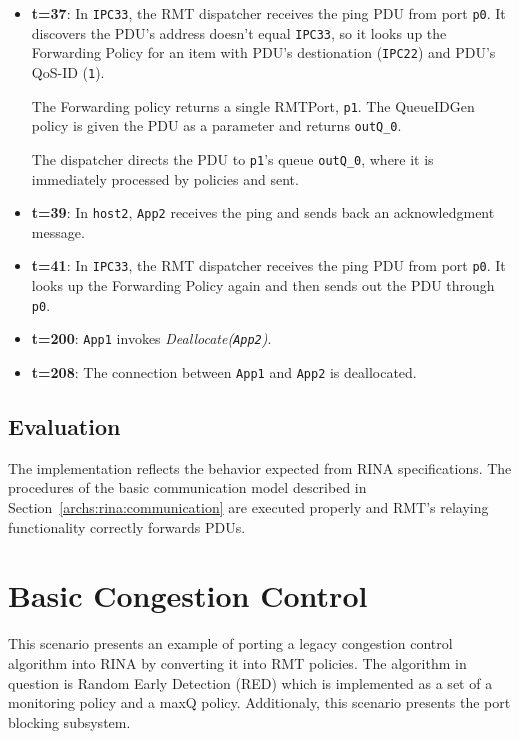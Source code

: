 \begin{itemize}
            \item \textbf{t=37}: In \texttt{IPC33}, the RMT dispatcher receives the ping PDU from port \texttt{p0}. It discovers the PDU's address doesn't equal \texttt{IPC33}, so it looks up the Forwarding Policy for an item with PDU's destionation (\texttt{IPC22}) and PDU's QoS-ID (\texttt{1}).

            The Forwarding policy returns a single RMTPort, \texttt{p1}. The QueueIDGen policy is given the PDU as a parameter and returns \texttt{outQ\_0}.

            The dispatcher directs the PDU to \texttt{p1}'s queue \texttt{outQ\_0}, where it is immediately processed by policies and sent.

            \item \textbf{t=39}: In \texttt{host2}, \texttt{App2} receives the ping and sends back an acknowledgment message.

            \item \textbf{t=41}: In \texttt{IPC33}, the RMT dispatcher receives the ping PDU from port \texttt{p0}. It looks up the Forwarding Policy again and then sends out the PDU through \texttt{p0}.

            \item \textbf{t=200}: \texttt{App1} invokes \emph{Deallocate(\texttt{App2})}.

            \item \textbf{t=208}: The connection between \texttt{App1} and \texttt{App2} is deallocated.
            \end{itemize}

        \subsection{Evaluation}

            The implementation reflects the behavior expected from RINA specifications. The procedures of the basic communication model described in Section~\ref{archs:rina:communication} are executed properly and RMT's relaying functionality correctly forwards PDUs.


    \section{Basic Congestion Control}

        This scenario presents an example of porting a legacy congestion control algorithm into RINA by converting it into RMT policies. The algorithm in question is Random Early Detection (RED) which is implemented as a set of a monitoring policy and a maxQ policy. Additionaly, this scenario presents the port blocking subsystem.

